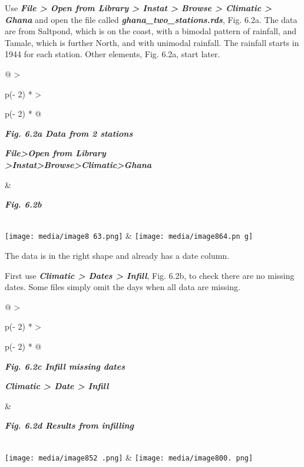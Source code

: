 \documentclass[
  letterpaper,
  DIV=11,
  numbers=noendperiod]{scrreprt}
\begin{document}
Use \textbf{\emph{File \textgreater{} Open from Library \textgreater{}
Instat \textgreater{} Browse \textgreater{} Climatic \textgreater{}
Ghana}} and open the file called
\textbf{\emph{ghana\_two\_stations.rds}}, Fig. 6.2a. The data are from
Saltpond, which is on the coast, with a bimodal pattern of rainfall, and
Tamale, which is further North, and with unimodal rainfall. The rainfall
starts in 1944 for each station. Other elements, Fig. 6.2a, start later.

\begin{longtable}[]{@{}
  >{\raggedright\arraybackslash}p{(\columnwidth - 2\tabcolsep) * }
  >{\raggedright\arraybackslash}p{(\columnwidth - 2\tabcolsep) * }@{}}
\toprule\noalign{}
\begin{minipage}[b]{\linewidth}\raggedright
\textbf{\emph{Fig. 6.2a Data from 2 stations}}

\textbf{\emph{File\textgreater Open from Library\\
\textgreater Instat\textgreater Browse\textgreater Climatic\textgreater Ghana}}\strut
\end{minipage} & \begin{minipage}[b]{\linewidth}\raggedright
\textbf{\emph{Fig. 6.2b}}
\end{minipage} \\
\midrule\noalign{}
\endhead
\bottomrule\noalign{}
\endlastfoot
\texttt{[image: media/image8 63.png]}
&
\texttt{[image: media/image864.pn g]} \\
\end{longtable}

The data is in the right shape and already has a date column.

First use \textbf{\emph{Climatic \textgreater{} Dates \textgreater{}
Infill}}, Fig. 6.2b, to check there are no missing dates. Some files
simply omit the days when all data are missing.

\begin{longtable}[]{@{}
  >{\raggedright\arraybackslash}p{(\columnwidth - 2\tabcolsep) * }
  >{\raggedright\arraybackslash}p{(\columnwidth - 2\tabcolsep) * }@{}}
\toprule\noalign{}
\begin{minipage}[b]{\linewidth}\raggedright
\textbf{\emph{Fig. 6.2c Infill missing dates}}

\textbf{\emph{Climatic \textgreater{} Date \textgreater{} Infill}}
\end{minipage} & \begin{minipage}[b]{\linewidth}\raggedright
\textbf{\emph{Fig. 6.2d Results from infilling}}
\end{minipage} \\
\midrule\noalign{}
\endhead
\bottomrule\noalign{}
\endlastfoot
\texttt{[image: media/image852 .png]}
&
\texttt{[image: media/image800. png]} \\
\end{longtable}
\end{document}
